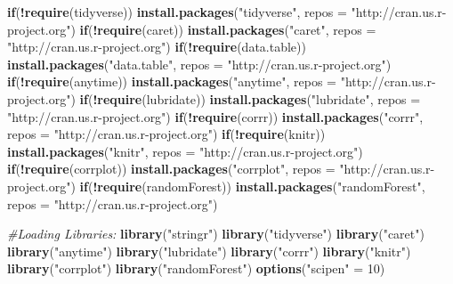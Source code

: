 \documentclass[
  a3paper,
]{article}
\newenvironment{Shaded}{\begin{snugshade}}{\end{snugshade}}
\newcommand{\CommentTok}[1]{\textcolor[rgb]{0.56,0.35,0.01}{\textit{#1}}}
\newcommand{\ControlFlowTok}[1]{\textcolor[rgb]{0.13,0.29,0.53}{\textbf{#1}}}
\newcommand{\DataTypeTok}[1]{\textcolor[rgb]{0.13,0.29,0.53}{#1}}
\newcommand{\DecValTok}[1]{\textcolor[rgb]{0.00,0.00,0.81}{#1}}
\newcommand{\KeywordTok}[1]{\textcolor[rgb]{0.13,0.29,0.53}{\textbf{#1}}}
\newcommand{\NormalTok}[1]{#1}
\newcommand{\OperatorTok}[1]{\textcolor[rgb]{0.81,0.36,0.00}{\textbf{#1}}}
\newcommand{\StringTok}[1]{\textcolor[rgb]{0.31,0.60,0.02}{#1}}
\begin{document}
\begin{Shaded}
\begin{Highlighting}[]
\ControlFlowTok{if}\NormalTok{(}\OperatorTok{!}\KeywordTok{require}\NormalTok{(tidyverse)) }
  \KeywordTok{install.packages}\NormalTok{(}\StringTok{"tidyverse"}\NormalTok{, }\DataTypeTok{repos =} \StringTok{"http://cran.us.r-project.org"}\NormalTok{)}
\ControlFlowTok{if}\NormalTok{(}\OperatorTok{!}\KeywordTok{require}\NormalTok{(caret)) }
  \KeywordTok{install.packages}\NormalTok{(}\StringTok{"caret"}\NormalTok{, }\DataTypeTok{repos =} \StringTok{"http://cran.us.r-project.org"}\NormalTok{)}
\ControlFlowTok{if}\NormalTok{(}\OperatorTok{!}\KeywordTok{require}\NormalTok{(data.table)) }
  \KeywordTok{install.packages}\NormalTok{(}\StringTok{"data.table"}\NormalTok{, }\DataTypeTok{repos =} \StringTok{"http://cran.us.r-project.org"}\NormalTok{)}
\ControlFlowTok{if}\NormalTok{(}\OperatorTok{!}\KeywordTok{require}\NormalTok{(anytime)) }
  \KeywordTok{install.packages}\NormalTok{(}\StringTok{"anytime"}\NormalTok{, }\DataTypeTok{repos =} \StringTok{"http://cran.us.r-project.org"}\NormalTok{)}
\ControlFlowTok{if}\NormalTok{(}\OperatorTok{!}\KeywordTok{require}\NormalTok{(lubridate)) }
  \KeywordTok{install.packages}\NormalTok{(}\StringTok{"lubridate"}\NormalTok{, }\DataTypeTok{repos =} \StringTok{"http://cran.us.r-project.org"}\NormalTok{)}
\ControlFlowTok{if}\NormalTok{(}\OperatorTok{!}\KeywordTok{require}\NormalTok{(corrr)) }
  \KeywordTok{install.packages}\NormalTok{(}\StringTok{"corrr"}\NormalTok{, }\DataTypeTok{repos =} \StringTok{"http://cran.us.r-project.org"}\NormalTok{)}
\ControlFlowTok{if}\NormalTok{(}\OperatorTok{!}\KeywordTok{require}\NormalTok{(knitr)) }
  \KeywordTok{install.packages}\NormalTok{(}\StringTok{"knitr"}\NormalTok{, }\DataTypeTok{repos =} \StringTok{"http://cran.us.r-project.org"}\NormalTok{)}
\ControlFlowTok{if}\NormalTok{(}\OperatorTok{!}\KeywordTok{require}\NormalTok{(corrplot)) }
  \KeywordTok{install.packages}\NormalTok{(}\StringTok{"corrplot"}\NormalTok{, }\DataTypeTok{repos =} \StringTok{"http://cran.us.r-project.org"}\NormalTok{)}
\ControlFlowTok{if}\NormalTok{(}\OperatorTok{!}\KeywordTok{require}\NormalTok{(randomForest)) }
  \KeywordTok{install.packages}\NormalTok{(}\StringTok{"randomForest"}\NormalTok{, }\DataTypeTok{repos =} \StringTok{"http://cran.us.r-project.org"}\NormalTok{)}

\CommentTok{#Loading Libraries:}
\KeywordTok{library}\NormalTok{(}\StringTok{"stringr"}\NormalTok{)}
\KeywordTok{library}\NormalTok{(}\StringTok{"tidyverse"}\NormalTok{)}
\KeywordTok{library}\NormalTok{(}\StringTok{"caret"}\NormalTok{)}
\KeywordTok{library}\NormalTok{(}\StringTok{"anytime"}\NormalTok{)}
\KeywordTok{library}\NormalTok{(}\StringTok{"lubridate"}\NormalTok{)}
\KeywordTok{library}\NormalTok{(}\StringTok{"corrr"}\NormalTok{)}
\KeywordTok{library}\NormalTok{(}\StringTok{"knitr"}\NormalTok{)}
\KeywordTok{library}\NormalTok{(}\StringTok{"corrplot"}\NormalTok{)}
\KeywordTok{library}\NormalTok{(}\StringTok{"randomForest"}\NormalTok{)}
\KeywordTok{options}\NormalTok{(}\StringTok{"scipen"}\NormalTok{ =}\StringTok{ }\DecValTok{10}\NormalTok{)}


\end{Highlighting}
\end{Shaded}
\end{document}
